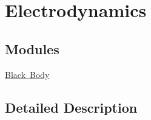 \hypertarget{group___e_g_x_phys-_electrodynamics}{}\section{Electrodynamics}
\label{group___e_g_x_phys-_electrodynamics}
\subsection*{Modules}
\begin{DoxyCompactItemize}
\item 
\mbox{\hyperlink{group___e_g_x_phys-_electrodynamics-_black_body}{Black Body}}
\end{DoxyCompactItemize}


\subsection{Detailed Description}
